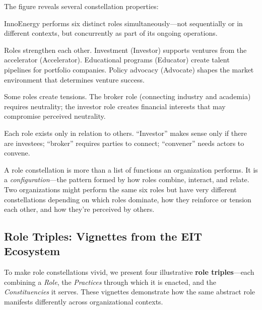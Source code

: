 \documentclass[../main.tex]{subfiles}
\begin{document}
The figure reveals several constellation properties:

\begin{description}[leftmargin=0.5cm, itemsep=0.3em]
\item[Multiplicity] InnoEnergy performs six distinct roles simultaneously---not sequentially or in different contexts, but concurrently as part of its ongoing operations.

\item[Reinforcement] Roles strengthen each other. Investment (Investor) supports ventures from the accelerator (Accelerator). Educational programs (Educator) create talent pipelines for portfolio companies. Policy advocacy (Advocate) shapes the market environment that determines venture success.

\item[Tension] Some roles create tensions. The broker role (connecting industry and academia) requires neutrality; the investor role creates financial interests that may compromise perceived neutrality.

\item[Relational definition] Each role exists only in relation to others. ``Investor'' makes sense only if there are investees; ``broker'' requires parties to connect; ``convener'' needs actors to convene.
\end{description}

\begin{insightbox}
A role constellation is more than a list of functions an organization performs. It is a \emph{configuration}---the pattern formed by how roles combine, interact, and relate. Two organizations might perform the same six roles but have very different constellations depending on which roles dominate, how they reinforce or tension each other, and how they're perceived by others.
\end{insightbox}

\subsection{Role Triples: Vignettes from the EIT Ecosystem}

To make role constellations vivid, we present four illustrative \textbf{role triples}---each combining a \textit{Role}, the \textit{Practices} through which it is enacted, and the \textit{Constituencies} it serves. These vignettes demonstrate how the same abstract role manifests differently across organizational contexts.
\end{document}
